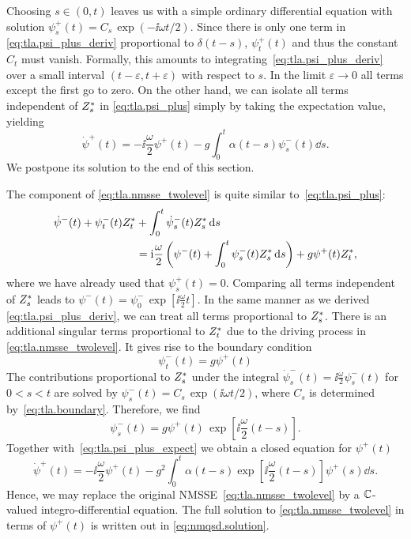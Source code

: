 Choosing $s \in (0, t)$ leaves us with a simple ordinary differential equation with solution $\psi^+_s(t) = C_s \, \exp(- \ii \omega t / 2)$.
Since there is only one term in \autoref{eq:tla.psi_plus_deriv} proportional to $\delta(t-s)$, $\psi^+_t(t)$ and thus the constant $C_t$ must vanish.
Formally, this amounts to integrating~\ref{eq:tla.psi_plus_deriv} over a small interval $(t-\varepsilon, t+\varepsilon)$ with respect to $s$.
In the limit $\varepsilon \to 0$ all terms except the first go to zero.
On the other hand, we can isolate all terms independent of ${Z}^*_s$ in \autoref{eq:tla.psi_plus} simply by taking the expectation value, yielding
\begin{equation}
  \dot\psi^+(t) = -\ii \frac{\omega}{2} \psi^+(t)  - g \int_0^t \alpha(t - s) \psi^-_s(t) \dd s.
  \label{eq:tla.psi_plus_expect}
\end{equation}
We postpone its solution to the end of this section.

The \quotes{-} component of \autoref{eq:tla.nmsse_twolevel} is quite similar to~\ref{eq:tla.psi_plus}:
\begin{align}
  \dot\psi^-(t) + \psi^-_t(t){Z}^*_t &+ \int_0^t \dot\psi^-_s(t){Z}^*_s \, \mathrm{d} s \nonumber \\
  &= \mathrm{i} \frac{\omega}{2} \left( \psi^-(t) + \int_0^t \psi^-_s(t){Z}^*_s \, \mathrm{d} s \right) + g \psi^+(t){Z}^*_t,
  \label{eq:tla.psi_minus}
\end{align}
where we have already used that $\psi^+_s(t) = 0$.
Comparing all terms independent of ${Z}^*_s$ leads to $\psi^-(t) = \psi^-_0 \, \exp[\ii \frac{\omega}{2} t]$.
In the same manner as we derived \autoref{eq:tla.psi_plus_deriv}, we can treat all terms proportional to ${Z}^*_s$.
There is an additional singular terms proportional to ${Z}^*_t$ due to the driving process in \autoref{eq:tla.nmsse_twolevel}.
It gives rise to the boundary condition
\begin{equation}
  \psi^-_t(t) = g \psi^+(t)
  \label{eq:tla.boundary}
\end{equation}
The contributions proportional to ${Z}^*_s$ under the integral $\dot\psi^-_s(t) = \ii \frac{\omega}{2} \psi^-_s(t)$ for $0 < s < t$ are solved by $\psi^-_s(t) = C_s \, \exp(\ii\omega t / 2)$, where $C_s$ is determined by~\ref{eq:tla.boundary}.
Therefore, we find
\begin{equation*}
  \psi^-_s(t) = g \psi^+(t) \, \exp[\ii \frac{\omega}{2}(t - s)].
\end{equation*}
Together with~\ref{eq:tla.psi_plus_expect} we obtain a closed equation for $\psi^+(t)$
\begin{equation}
  \dot\psi^+(t) = -\ii \frac{\omega}{2} \psi^+(t) - g^2 \int_0^t \alpha(t - s) \exp[\ii \frac{\omega}{2} (t - s)] \psi^+(s) \dd s.
  \label{eq:tla.psi_plus_eq}
\end{equation}
Hence, we may replace the original NMSSE~\ref{eq:tla.nmsse_twolevel} by a $\mathbb{C}$-valued integro-differential equation.
The full solution to \autoref{eq:tla.nmsse_twolevel} in terms of $\psi^+(t)$ is written out in \autoref{eq:nmqsd.solution}.


